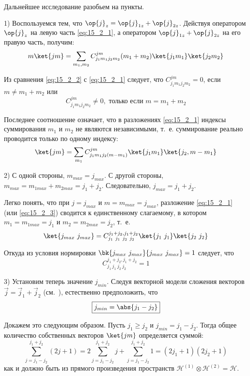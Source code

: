 Дальнейшее исследование разобьем на пункты.

1) Воспользуемся тем, что $\op{j}_z = \op{j}_{1z} + \op{j}_{2z}$. Действуя оператором $\op{j}_z$ на левую часть \eqref{eq:15_2_1}, а оператором $\op{j}_{1z} + \op{j}_{2z}$ на его правую часть, получим:
\begin{equation}
\label{eq:15_2_2}
m\ket{j m} = \sum_{m_1, m_2} C^{j m}_{j_1 m_1 j_2 m_2} (m_1 + m_2)\ket{j_1 m_1}\ket{j_2 m_2}
\end{equation}

Из сравнения \eqref{eq:15_2_2} с \eqref{eq:15_2_1} следует, что $C^{j m}_{j_1 m_1 j_2 m_2} = 0$, если ${m \neq m_1 + m_2}$ или
$$
\boxed{C^{j m}_{j_1 m_1 j_2 m_2} \neq 0, \text{~только если~} m = m_1 + m_2}
$$

Последнее соотношение означает, что в разложениях \eqref{eq:15_2_1} индексы суммирования $m_1$ и $m_2$ не являются независимыми, т.~е. суммирование реально проводится только по одному индексу:
\begin{equation}
\label{eq:15_2_3}
\ket{j m} = \sum_{m_1} C^{j m}_{j_1 m_1 j_2 (m - m_1)} \ket{j_1 m_1}\ket{j_2, m - m_1}
\end{equation}

2) С одной стороны, $m_{max} = j_{max}$. С другой стороны, ${m_{max} = m_{1max} + m_{2max} = j_1 + j_2}$. Следовательно, $\boxed{j_{max} = j_1 + j_2}$.

Легко понять, что при ${j = j_{max}}$ и ${m = m_{max} = j_{max}}$, разложение \eqref{eq:15_2_1} (или \eqref{eq:15_2_3}) сводится к единственному слагаемому, в котором ${m_1 = m_{1max} = j_1}$ и ${m_2 = m_{2max} = j_2}$, т.~е.
$$
\ket{j_{max}~j_{max}} = C^{j_1+j_2, j_1 + j_2}_{j_1~j_1~j_2~j_2} \ket{j_1~j_1}\ket{j_2~j_2}
$$

Откуда из условия нормировки $\bk{j_{max}~j_{max}}{j_{max}~j_{max}} = 1$ следует, что 
$$
\boxed{C^{j_1+j_2, j_1 + j_2}_{j_1~j_1~j_2~j_2} = 1}
$$

3) Установим теперь значение $j_{min}$. Следуя векторной модели сложения векторов $\vec j = \vec j_1 + \vec j_2$ (см.~), естественно предположить, что 
$$
\boxed{j_{min} = \abs{j_1 - j_2}}
$$

Докажем это следующим образом. Пусть $j_1 \ge j_2$ и $j_{min} = j_1 - j_2$. Тогда общее количество собственных векторов $\ket{j m}$ определяется суммой:
$$
\sum_{j = j_1 - j_2}^{j_1 + j_2} (2j + 1) = 2 \sum_{j = j_1 - j_2}^{j_1 + j_2} j + \sum_{j = j_1 - j_2}^{j_1 + j_2} 1 = (2j_1 + 1)(2j_2 + 1)
$$
как и должно быть из прямого произведения пространств $\mathcal{H}^{(1)} \otimes \mathcal{H}^{(2)} = \mathcal{H}$.
 
